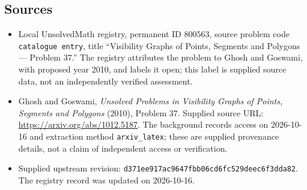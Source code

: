 \documentclass[11pt]{article}
\begin{document}
\subsection{Sources}
\begin{itemize}
\item Local UnsolvedMath registry, permanent ID \(800563\), source problem code \texttt{catalogue entry}, title ``Visibility Graphs of Points, Segments and Polygons --- Problem 37.'' The registry attributes the problem to Ghosh and Goswami, with proposed year 2010, and labels it open; this label is supplied source data, not an independently verified assessment.
\item Ghosh and Goswami, \emph{Unsolved Problems in Visibility Graphs of Points, Segments and Polygons} (2010), Problem 37. Supplied source URL: \url{https://arxiv.org/abs/1012.5187}. The background records access on 2026-10-16 and extraction method \texttt{arxiv\_latex}; these are supplied provenance details, not a claim of independent access or verification.
\item Supplied upstream revision: \texttt{d371ee917ac9647fbb06cd6fc529deec6f3dda82}. The registry record was updated on 2026-10-16.
\end{itemize}
\end{document}

